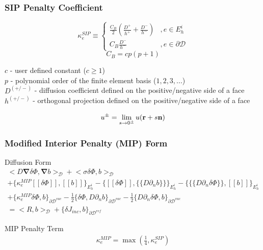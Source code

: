 \documentclass[compress,10pt]{beamer}
\renewcommand{\vec}[1]{\mathbf{#1}}
\begin{document}
\begin{frame}[t]\frametitle{SIP Penalty Coefficient}
\begin{block}{}{
	\begin{equation*}
		\kappa_e^{SIP} \equiv 
		\begin{cases}
		\frac{C_B}{2} \left(  \frac{D^+}{h^+} + \frac{D^-}{h^-}  \right) & , e \in E_h^i \\
		C_B \frac{D^-}{h^-}  & , e \in \partial \mathcal{D}
		\end{cases}
	\end{equation*}}
	\begin{equation*}
		C_B = c p (p+1)
	\end{equation*}
\end{block}
\begin{block}{}
$c$ - user defined constant ($c \geq 1$) \\
$p$ - polynomial order of the finite element basis ($1,2,3,...$) \\
$D^{(+/-)}$ - diffusion coefficient defined on the positive/negative side of a face\\
$h^{(+/-)}$ - orthogonal projection defined on the positive/negative side of a face
\end{block}
\begin{block}{}
	\begin{equation*}
		u^{\pm} = \lim_{s \rightarrow 0^{\pm}} u ({\bf r} + s {\bf n})
	\end{equation*}
\end{block}
\end{frame}
\begin{frame}[t]\frametitle{Modified Interior Penalty (MIP) Form}
	\begin{block}{Diffusion Form}{\footnotesize
		\begin{gather*}
			 \Big<  D \vec{\nabla} \delta \Phi , \vec{\nabla} b  \Big>_{\mathcal{D}} + \Big<  \sigma \delta  \Phi ,  b  \Big>_{\mathcal{D}}    \\
			+  \Big\{ \kappa_e^{MIP} [\![ \delta  \Phi ]\!] , [\![  b ]\!]\Big\}_{E_h^i} - \Big\{  [\![  \delta \Phi ]\!] , \{\!\{  D \partial_n b \}\!\}\Big\}_{E_h^i} -\Big\{ \{\!\{  D \partial_n \delta \Phi \}\!\} , [\![ b ]\!]\Big\}_{E_h^i} \\
			+ \Big\{ \kappa_e^{MIP} \delta  \Phi ,   b \Big\}_{\partial \mathcal{D}^{vac}} -  \frac{1}{2} \Big\{  \delta \Phi  ,  D \partial_n b \Big\}_{\partial \mathcal{D}^{vac}} -  \frac{1}{2} \Big\{   D \partial_n \delta \Phi ,   b \Big\}_{\partial \mathcal{D}^{vac}}  \\
 = \Big<  R , b  \Big>_{\mathcal{D}}  +  \Big\{  \delta J_{inc}, b  \Big\}_{\partial \mathcal{D}^{ref}}
        	\end{gather*} }
\end{block}
	\begin{block}{MIP Penalty Term}{\footnotesize
		\begin{align*}
			\kappa_e^{MIP} = \max(\frac{1}{4},  \kappa_e^{SIP})
		\end{align*} }
	\end{block}
\end{frame}
\end{document}
